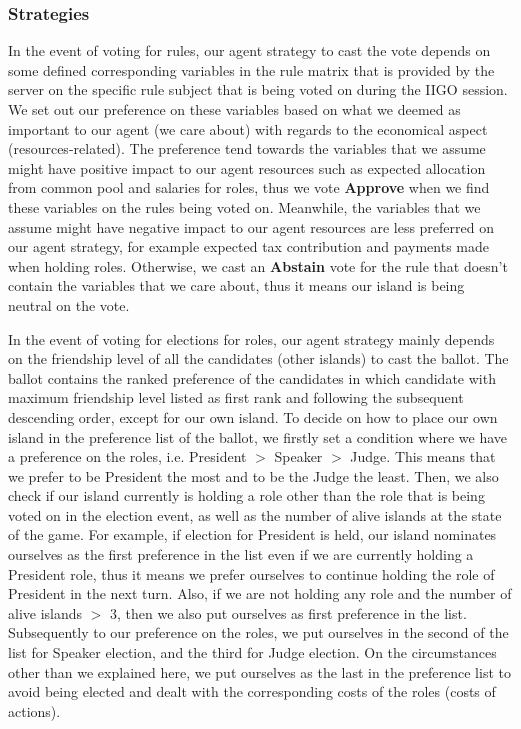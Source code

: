 \subsubsection{Strategies} \label{subsubsec:Team6_Voting:Strategies}
In the event of voting for rules, our agent strategy to cast the vote depends on some defined corresponding variables in the rule matrix that is provided by the server on the specific rule subject that is being voted on during the IIGO session. We set out our preference on these variables based on what we deemed as important to our agent (we care about) with regards to the economical aspect (resources-related). The preference tend towards the variables that we assume might have positive impact to our agent resources such as expected allocation from common pool and salaries for roles, thus we vote \textbf{Approve} when we find these variables on the rules being voted on. Meanwhile, the variables that we assume might have negative impact to our agent resources are less preferred on our agent strategy, for example expected tax contribution and payments made when holding roles. Otherwise, we cast an \textbf{Abstain} vote for the rule that doesn't contain the variables that we care about, thus it means our island is being neutral on the vote.

In the event of voting for elections for roles, our agent strategy mainly depends on the friendship level of all the candidates (other islands) to cast the ballot. The ballot contains the ranked preference of the candidates in which candidate with maximum friendship level listed as first rank and following the subsequent descending order, except for our own island. To decide on how to place our own island in the preference list of the ballot, we firstly set a condition where we have a preference on the roles, i.e. President $>$ Speaker $>$ Judge. This means that we prefer to be President the most and to be the Judge the least. Then, we also check if our island currently is holding a role other than the role that is being voted on in the election event, as well as the number of alive islands at the state of the game. For example, if election for President is held, our island nominates ourselves as the first preference in the list even if we are currently holding a President role, thus it means we prefer ourselves to continue holding the role of President in the next turn. Also, if we are not holding any role and the number of alive islands $>$ 3, then we also put ourselves as first preference in the list. Subsequently to our preference on the roles, we put ourselves in the second of the list for Speaker election, and the third for Judge election. On the circumstances other than we explained here, we put ourselves as the last in the preference list to avoid being elected and dealt with the corresponding costs of the roles (costs of actions).

